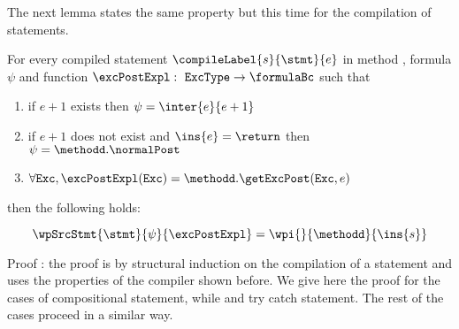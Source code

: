 The next lemma states the same property but this time for the compilation of statements.
\begin{thm}\label{relWpStmt}
     For every compiled statement $\compileLabel{s}{\stmt}{e}$  in  method \methodd, formula $\psi$ and 
    function $\excPostExpl : \mbox{ \rm \texttt{ExcType}}  \rightarrow \formulaBc $ such that 

      \begin{enumerate}
            \item if $e+1$ exists  then $\psi = \inter{e}{e+1}$
	    \item if $e+1$ does not exist and $\ins{e} = \return$ then $\psi = \methodd. \normalPost$
	    \item $\forall \mbox{\rm\texttt{Exc}} ,  \excPostExpl( \mbox{\rm\texttt{Exc}} ) = \methodd.\getExcPost(\mbox{\rm\texttt{Exc}}, e ) $ 
      \end{enumerate} then the following holds: 
  
     $$   \wpSrcStmt{\stmt}{\psi }{\excPostExpl} = \wpi{}{\methodd}{\ins{s}}$$   
\end{thm}

Proof : the proof is  by structural induction on the compilation of a statement and uses the properties of the compiler 
        shown before. We give here the proof  for the cases of compositional statement, while and try catch statement.
The rest of the cases proceed in a similar way.


